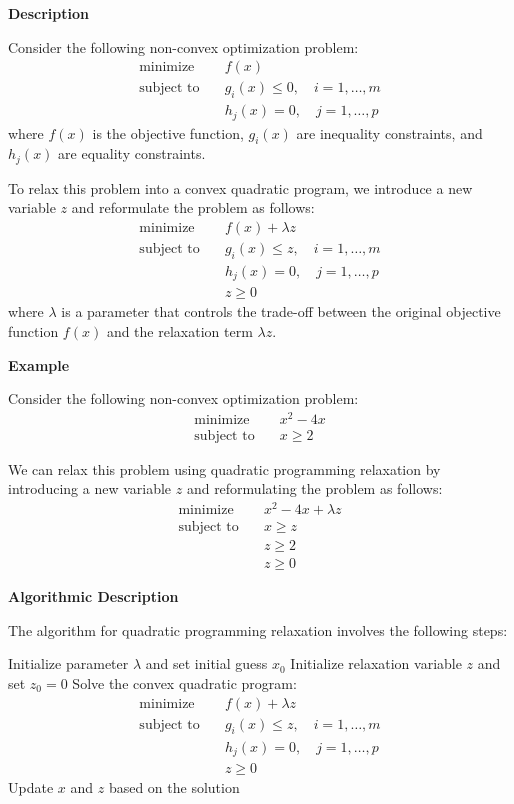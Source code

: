 \documentclass[12pt]{book} %
\begin{document}
\textbf{Description}

Consider the following non-convex optimization problem:
\begin{align*}
\text{minimize} \quad & f(x) \\
\text{subject to} \quad & g_i(x) \leq 0, \quad i = 1, \ldots, m \\
& h_j(x) = 0, \quad j = 1, \ldots, p
\end{align*}
where \(f(x)\) is the objective function, \(g_i(x)\) are inequality constraints, and \(h_j(x)\) are equality constraints.

To relax this problem into a convex quadratic program, we introduce a new variable \(z\) and reformulate the problem as follows:
\begin{align*}
\text{minimize} \quad & f(x) + \lambda z \\
\text{subject to} \quad & g_i(x) \leq z, \quad i = 1, \ldots, m \\
& h_j(x) = 0, \quad j = 1, \ldots, p \\
& z \geq 0
\end{align*}
where \(\lambda\) is a parameter that controls the trade-off between the original objective function \(f(x)\) and the relaxation term \(\lambda z\).

\textbf{Example}

Consider the following non-convex optimization problem:
\begin{align*}
\text{minimize} \quad & x^2 - 4x \\
\text{subject to} \quad & x \geq 2
\end{align*}

We can relax this problem using quadratic programming relaxation by introducing a new variable \(z\) and reformulating the problem as follows:
\begin{align*}
\text{minimize} \quad & x^2 - 4x + \lambda z \\
\text{subject to} \quad & x \geq z \\
& z \geq 2 \\
& z \geq 0
\end{align*}

\textbf{Algorithmic Description}

The algorithm for quadratic programming relaxation involves the following steps:
\FloatBarrier
\begin{algorithm}
\caption{Quadratic Programming Relaxation}
\begin{algorithmic}[1]
\State Initialize parameter \(\lambda\) and set initial guess \(x_0\)
\State Initialize relaxation variable \(z\) and set \(z_0 = 0\)
\Repeat
\State Solve the convex quadratic program:
\begin{align*}
\text{minimize} \quad & f(x) + \lambda z \\
\text{subject to} \quad & g_i(x) \leq z, \quad i = 1, \ldots, m \\
& h_j(x) = 0, \quad j = 1, \ldots, p \\
& z \geq 0
\end{align*}
\State Update \(x\) and \(z\) based on the solution
\end{algorithmic}
\end{algorithm}
\FloatBarrier
\end{document}

